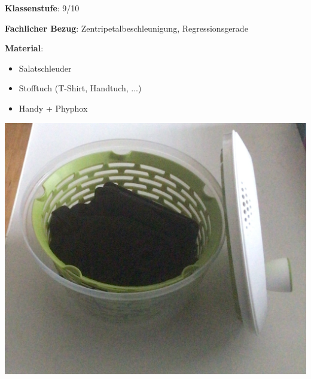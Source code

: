 \documentclass[../main.tex]{subfiles}
\begin{document}
\begin{tcolorbox}[
    width=\textwidth,
    height=\textheight,
    title=Phyphox: Salatschleuder,
    fonttitle=\Large,
    before title=\vspace{0.2cm}, after title=\vspace{0.2cm},
    colback=white,
    title filled=true, 
    colbacktitle=myorange,
    colframe=black,
    coltitle=black,
    ]



    \begin{minipage}[]{0.5\textwidth}
        \vspace{0.2cm}
        \textbf{Klassenstufe}: 9/10

        \vspace{0.7cm}
        \textbf{Fachlicher Bezug}: Zentripetalbeschleunigung, Regressionsgerade
        
        \vspace{0.7cm} 
        \textbf{Material}:
        \begin{itemize}[noitemsep]
            \item Salatschleuder
            \item Stofftuch (T-Shirt, Handtuch, ...)
            \item Handy + Phyphox
        \end{itemize}
    \end{minipage}
    \hspace{1.8cm}
    \begin{minipage}[]{0.35\textwidth}
        \includegraphics[width=\textwidth]{img/versuchsaufbau}
    \end{minipage}


\end{tcolorbox}
\end{document}
